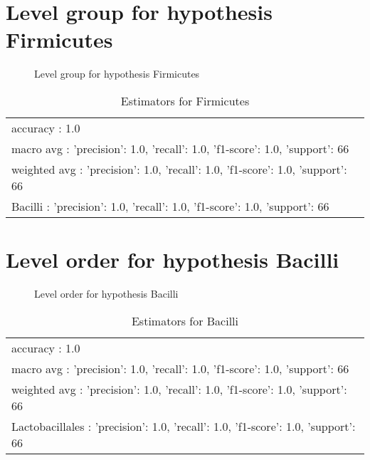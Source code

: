 \documentclass[12pt]{article}
\begin{document}
\clearpage
\pagebreak[4]
\section*{Level group for hypothesis Firmicutes}
\begin{figure}[h]
\centering


\caption{Level group for hypothesis Firmicutes}
\label{f-Level group for hypothesis Firmicutes}
\end{figure}
\begin{table}[htp]
\begin{tabular}{l}
accuracy : 1.0 \\
macro avg : {'precision': 1.0, 'recall': 1.0, 'f1-score': 1.0, 'support': 66} \\
weighted avg : {'precision': 1.0, 'recall': 1.0, 'f1-score': 1.0, 'support': 66} \\
Bacilli : {'precision': 1.0, 'recall': 1.0, 'f1-score': 1.0, 'support': 66}
\end{tabular}
\caption*{Estimators for Firmicutes}
\end{table}




\clearpage
\pagebreak[4]
\section*{Level order for hypothesis Bacilli}
\begin{figure}[h]
\centering


\caption{Level order for hypothesis Bacilli}
\label{f-Level order for hypothesis Bacilli}
\end{figure}
\begin{table}[htp]
\begin{tabular}{l}
accuracy : 1.0 \\
macro avg : {'precision': 1.0, 'recall': 1.0, 'f1-score': 1.0, 'support': 66} \\
weighted avg : {'precision': 1.0, 'recall': 1.0, 'f1-score': 1.0, 'support': 66} \\
Lactobacillales : {'precision': 1.0, 'recall': 1.0, 'f1-score': 1.0, 'support': 66}
\end{tabular}
\caption*{Estimators for Bacilli}
\end{table}
\end{document}
